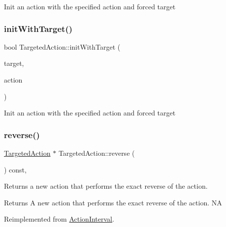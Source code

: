 Init an action with the specified action and forced target \mbox{\label{classTargetedAction_ab1de67f9331ac62396a6c22f7c7a6b67}} 
\subsubsection{\texorpdfstring{init\+With\+Target()}{initWithTarget()}\hspace{0.1cm}{\footnotesize\ttfamily [2/2]}}
{\footnotesize\ttfamily bool Targeted\+Action\+::init\+With\+Target (\begin{DoxyParamCaption}\item[{\hyperlink{classNode}{Node} $\ast$}]{target,  }\item[{\hyperlink{classFiniteTimeAction}{Finite\+Time\+Action} $\ast$}]{action }\end{DoxyParamCaption})}

Init an action with the specified action and forced target \mbox{\label{classTargetedAction_a58dc5d2de3cecda888ae57c299cc6c1c}} 
\subsubsection{\texorpdfstring{reverse()}{reverse()}\hspace{0.1cm}{\footnotesize\ttfamily [1/2]}}
{\footnotesize\ttfamily \hyperlink{classTargetedAction}{Targeted\+Action} $\ast$ Targeted\+Action\+::reverse (\begin{DoxyParamCaption}\item[{void}]{ }\end{DoxyParamCaption}) const\hspace{0.3cm}{\ttfamily [override]}, {\ttfamily [virtual]}}

Returns a new action that performs the exact reverse of the action.

\begin{DoxyReturn}{Returns}
A new action that performs the exact reverse of the action.  NA 
\end{DoxyReturn}


Reimplemented from \hyperlink{classActionInterval_a9f9ac7164036a0bc261a72f62a2b2da7}{Action\+Interval}.

